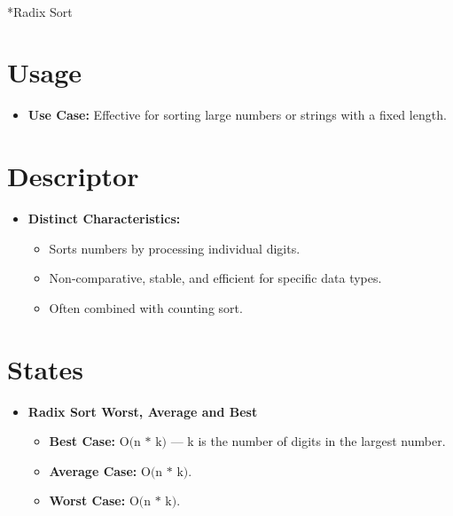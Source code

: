 \documentclass[
  letterpaper,
  DIV=11,
  numbers=noendperiod]{scrreprt}
\makeatletter
\let\oldparagraph\paragraph
\renewcommand{\paragraph}{
    \@ifstar
      \xxxParagraphStar
      \xxxParagraphNoStar
  }
\newcommand{\xxxParagraphStar}[1]{\oldparagraph*{#1}\mbox{}}
\newcommand{\xxxParagraphNoStar}[1]{\oldparagraph{#1}\mbox{}}
\providecommand{\tightlist}{%
  \setlength{\itemsep}{0pt}\setlength{\parskip}{0pt}}
\makeatother
\begin{document}
\paragraph*{Radix Sort}\label{radix-sort}

\section{Usage}

\begin{itemize}
\tightlist
\item
  \textbf{Use Case:} Effective for sorting large numbers or strings with
  a fixed length.
\end{itemize}

\section{Descriptor}

\begin{itemize}
\item
  \textbf{Distinct Characteristics:}

  \begin{itemize}
  \tightlist
  \item
    Sorts numbers by processing individual digits.
  \item
    Non-comparative, stable, and efficient for specific data types.
  \item
    Often combined with counting sort.
  \end{itemize}
\end{itemize}

\section{States}

\begin{itemize}
\item
  \textbf{Radix Sort Worst, Average and Best}

  \begin{itemize}
  \tightlist
  \item
    \textbf{Best Case:} \(\text{O(n ⁡* k)}\) --- k is the number of
    digits in the largest number.
  \item
    \textbf{Average Case:} \(\text{O(n ⁡* k)}\).
  \item
    \textbf{Worst Case:} \(\text{O(n ⁡* k)}\).
  \end{itemize}
\end{itemize}
\end{document}
